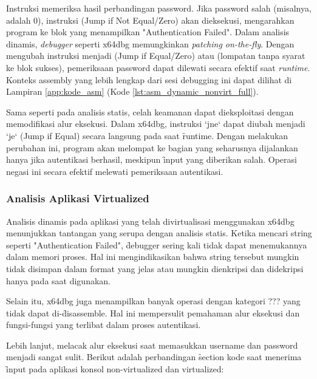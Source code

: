Instruksi  memeriksa hasil perbandingan password. Jika password salah (misalnya,  adalah 0), instruksi  (Jump if Not Equal/Zero) akan dieksekusi, mengarahkan program ke blok yang menampilkan "Authentication Failed". Dalam analisis dinamis, \textit{debugger} seperti x64dbg memungkinkan \textit{patching on-the-fly}. Dengan mengubah instruksi  menjadi  (Jump if Equal/Zero) atau  (lompatan tanpa syarat ke blok sukses), pemeriksaan password dapat dilewati secara efektif saat \textit{runtime}. Konteks assembly yang lebih lengkap dari sesi debugging ini dapat dilihat di Lampiran \ref{app:kode_asm} (Kode \ref{lst:asm_dynamic_nonvirt_full}).

Sama seperti pada analisis statis, celah keamanan dapat dieksploitasi dengan memodifikasi alur eksekusi. Dalam x64dbg, instruksi `jne` dapat diubah menjadi `je` (Jump if Equal) secara langsung pada saat \f{runtime}. Dengan melakukan perubahan ini, program akan melompat ke bagian yang seharusnya dijalankan hanya jika autentikasi berhasil, meskipun \f{input} yang diberikan salah. Operasi negasi ini secara efektif melewati pemeriksaan autentikasi.

\subsubsection{Analisis Aplikasi Virtualized}

Analisis dinamis pada aplikasi yang telah divirtualisasi menggunakan x64dbg menunjukkan tantangan yang serupa dengan analisis statis. Ketika mencari string seperti "Authentication Failed", \f{debugger} sering kali tidak dapat menemukannya dalam memori proses. Hal ini mengindikasikan bahwa string tersebut mungkin tidak disimpan dalam format yang jelas atau mungkin dienkripsi dan didekripsi hanya pada saat digunakan.

Selain itu, x64dbg juga menampilkan banyak operasi dengan kategori ??? yang tidak dapat di-\f{disassemble}. Hal ini mempersulit pemahaman alur eksekusi dan fungsi-fungsi yang terlibat dalam proses autentikasi.

Lebih lanjut, melacak alur eksekusi saat memasukkan username dan password menjadi sangat sulit. Berikut adalah perbandingan \f{section} kode saat menerima \f{input} pada aplikasi konsol non-virtualized dan virtualized:


